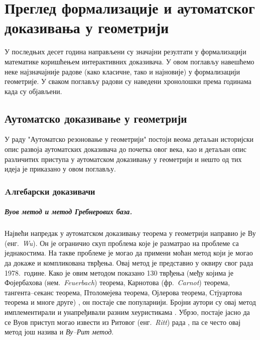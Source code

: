 \chapter[Доказивање у геометрији]{Преглед формализације и аутоматског доказивања у геометрији}
\label{chapter::pregled_oblasti}

У последњих десет година направљени су значајни резултати у
формализацији математике ко\-ри\-шће\-њем интерактивних доказивача. У
овом поглављу навешћемо неке најзначајније радове (како класичне, тако
и најновије) у формализацији геометрије. У сваком поглављу радови су
наведени хронолошки према годинама када су објављени.

\section{Аутоматско доказивање у геометрији}

У раду "Аутоматско резоновање у геометрији" \cite{hbook} постоји веома
детаљан историјски опис развоја аутоматских доказивача до почетка овог
века, као и детаљан опис различитих приступа у аутоматском доказивању
у геометрији и нешто од тих идеја је приказано у овом поглављу.

\subsection{Aлгебарски доказивачи}

\paragraph{Вуов метод и метод Гребнерових база.} 
Највећи напредак у аутоматском доказивању теорема у геометрији
направио је Ву (енг.~\emph{Wu}). Он је ограничио скуп проблема које је
разматрао на проблеме са једнакостима. На такве проблеме је могао да
примени моћан метод који је могао да докаже и компликована
тврђења. Овај метод је представио у оквиру свог рада \cite{wu}
1978.~године. Како је овим методом показано 130 тврђења (међу којима
је Фојербахова (нем.~\emph{Feuerbach}) теорема, Карнотова
(фр.~\emph{Carnot}) теорема, тангента--секанс теорема, Птоломејева
теорема, Ојлерова теорема, Стјуартова теорема и многе друге)
\cite{chou1984}, он постаје све популарнији. Бројни аутори су овај
метод имплементирали и унапређивали разним хеуристикама \cite{gao1990,
  sen1987mechanical, kapur1990refutational}. Убрзо, постаје јасно да
се Вуов приступ могао извести из Ритовог (енг.~\emph{Ritt}) рада
\cite{ritt1950differential}, па се често овај метод још назива и
\emph{Ву--Рит метод}.

